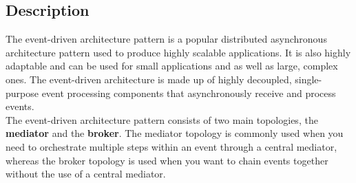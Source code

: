 \subsection{Description}
The event-driven architecture pattern is a popular distributed asynchronous architecture pattern used to produce highly scalable applications. It is also highly adaptable and can be used for small applications and as well as large, complex ones. The event-driven architecture is made up of highly decoupled, single-purpose event processing components that asynchronously receive and process events. \\
The event-driven architecture pattern consists of two main topologies, the \textbf{mediator} and the \textbf{broker}. The mediator topology is commonly used when you need to orchestrate multiple steps within an event through a central mediator, whereas the broker topology is used when you want to chain events together without the use of a central mediator. 

